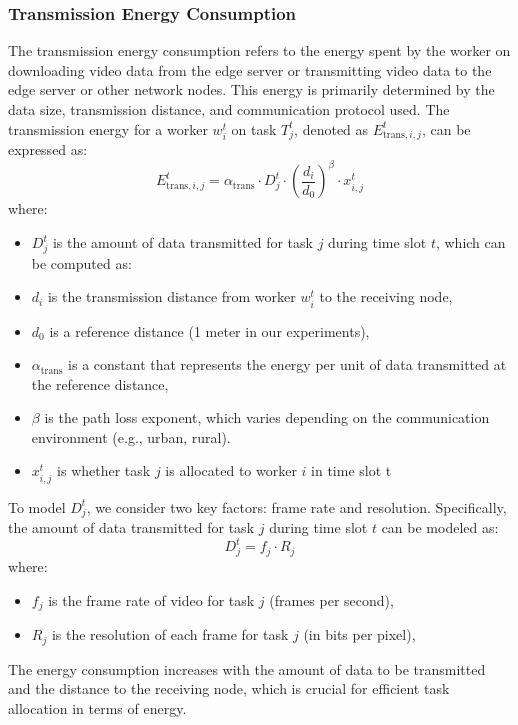 \subsubsection{Transmission Energy Consumption}
The transmission energy consumption refers to the energy spent by the worker on downloading video data from the edge server or transmitting video data to the edge server or other network nodes. This energy is primarily determined by the data size, transmission distance, and communication protocol used. The transmission energy for a worker \(w_i^t\) on task \(T_j^t\), denoted as \( E_{\text{trans}, i,j}^t \), can be expressed as:
\[
E_{\text{trans}, i,j}^t =  \alpha_{\text{trans}} \cdot D_j^t \cdot \left( \frac{d_i}{d_0} \right)^\beta \cdot x_{i,j}^t
\]
where:
\begin{itemize}
    \item \( D_j^t \) is the amount of data transmitted for task \( j \) during time slot \( t \), which can be computed as:
    \item \( d_i \) is the transmission distance from worker \( w_i^t \) to the receiving node,
    \item \( d_0 \) is a reference distance (1 meter in our experiments),
    \item \( \alpha_{\text{trans}} \) is a constant that represents the energy per unit of data transmitted at the reference distance,
    \item \( \beta \) is the path loss exponent, which varies depending on the communication environment (e.g., urban, rural).
    \item \(x_{i,j}^t\) is whether task \(j\) is allocated to worker \(i\) in time slot t
\end{itemize}
To model \( D_j^t \), we consider two key factors: frame rate and resolution. Specifically, the amount of data transmitted for task \( j \) during time slot \(t\) can be modeled as:
\[
D_j^t = f_j \cdot R_j 
\]
where:
\begin{itemize}
    \item \( f_j \) is the frame rate of video for task \( j \) (frames per second),
    \item \( R_j \) is the resolution of each frame for task \( j \) (in bits per pixel),
\end{itemize}

The energy consumption increases with the amount of data to be transmitted and the distance to the receiving node, which is crucial for efficient task allocation in terms of energy.

